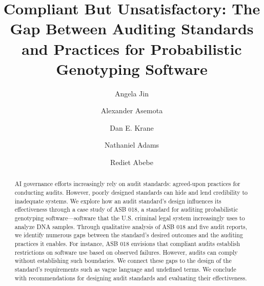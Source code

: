 \documentclass[sigconf]{acmart}
\begin{document}
\title{Compliant But Unsatisfactory: The Gap Between Auditing Standards and Practices for Probabilistic
Genotyping Software}

\author{Angela Jin}


\author{Alexander Asemota}

\author{Dan E. Krane}


\author{Nathaniel Adams}


\author{Rediet Abebe}

\renewcommand{\shortauthors}{Jin, Asemota, Krane, Adams, and Abebe}

\begin{abstract}
AI governance efforts increasingly rely on audit standards: agreed-upon practices for conducting audits. However, poorly designed standards can hide and lend credibility to inadequate systems. We explore how an audit standard’s design influences its effectiveness through a case study of ASB 018, a standard for auditing probabilistic genotyping software---software that the U.S. criminal legal system increasingly uses to analyze DNA samples. Through qualitative analysis of ASB 018 and five audit reports, we identify numerous gaps between the standard's desired outcomes and the auditing practices it enables. For instance, ASB 018 envisions that compliant audits establish restrictions on software use based on observed failures. However, audits can comply without establishing such boundaries. We connect these gaps to the design of the standard’s requirements such as vague language and undefined terms. We conclude with recommendations for designing audit standards and evaluating their effectiveness.
\end{abstract}
\end{document}
